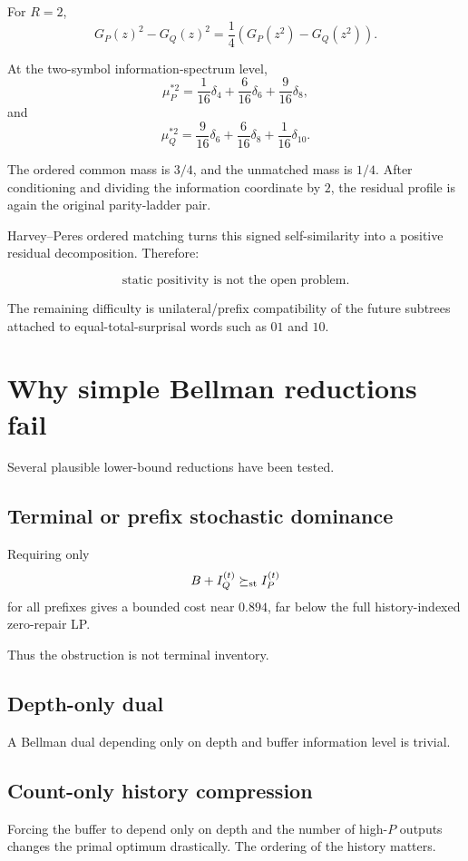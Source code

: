 \documentclass[11pt,a4paper]{article}
\begin{document}
For \(R=2\),
\[
G_P(z)^2-G_Q(z)^2
=
\frac14
\left(
G_P(z^2)-G_Q(z^2)
\right).
\]

At the two-symbol information-spectrum level,
\[
\mu_P^{*2}
=
\frac1{16}\delta_4
+
\frac6{16}\delta_6
+
\frac9{16}\delta_8,
\]
and
\[
\mu_Q^{*2}
=
\frac9{16}\delta_6
+
\frac6{16}\delta_8
+
\frac1{16}\delta_{10}.
\]

The ordered common mass is \(3/4\), and the unmatched mass is \(1/4\).
After conditioning and dividing the information coordinate by \(2\), the
residual profile is again the original parity-ladder pair.

Harvey--Peres ordered matching turns this signed self-similarity into a
positive residual decomposition.  Therefore:

\[
\boxed{
\text{static positivity is not the open problem.}
}
\]

The remaining difficulty is unilateral/prefix compatibility of the future
subtrees attached to equal-total-surprisal words such as \(01\) and \(10\).

\section{Why simple Bellman reductions fail}

Several plausible lower-bound reductions have been tested.

\subsection{Terminal or prefix stochastic dominance}

Requiring only
\[
B+I_Q^{(t)}
\succeq_{\rm st}
I_P^{(t)}
\]
for all prefixes gives a bounded cost near \(0.894\), far below the full
history-indexed zero-repair LP.

Thus the obstruction is not terminal inventory.

\subsection{Depth-only dual}

A Bellman dual depending only on depth and buffer information level is
trivial.

\subsection{Count-only history compression}

Forcing the buffer to depend only on depth and the number of high-\(P\)
outputs changes the primal optimum drastically.  The ordering of the
history matters.
\end{document}
